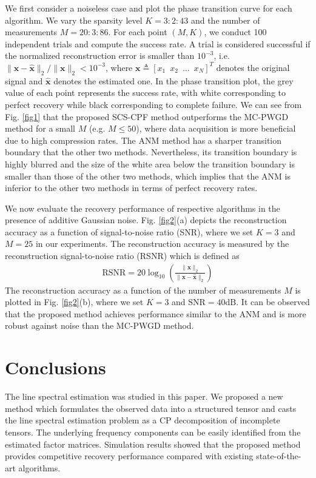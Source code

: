 \documentclass[10pt,journal,epsfig]{IEEEtran}
\begin{document}
We first consider a noiseless case and plot the phase transition
curve for each algorithm. We vary the sparsity level $K=3:2:43$
and the number of measurements $M=20:3:86$. For each point
$(M,K)$, we conduct 100 independent trials and compute the success
rate. A trial is considered successful if the normalized
reconstruction error is smaller than $10^{-3}$, i.e.
$\|\boldsymbol{x}-\boldsymbol{\hat{x}}\|_2/\|\boldsymbol{x}\|_2<10^{-3}$,
where $\boldsymbol{x}\triangleq
[x_1\phantom{0}x_2\phantom{0}\ldots\phantom{0}x_N]^T$ denotes the
original signal and $\boldsymbol{\hat{x}}$ denotes the estimated
one. In the phase transition plot, the grey value of each point
represents the success rate, with white corresponding to perfect
recovery while black corresponding to complete failure. We can see
from Fig. \ref{fig1} that the proposed SCS-CPF method outperforms
the MC-PWGD method for a small $M$ (e.g. $M\leq 50$), where data
acquisition is more beneficial due to high compression rates. The
ANM method has a sharper transition boundary that the other two
methods. Nevertheless, its transition boundary is highly blurred
and the size of the white area below the transition boundary is
smaller than those of the other two methods, which implies that
the ANM is inferior to the other two methods in terms of perfect
recovery rates.



We now evaluate the recovery performance of respective algorithms
in the presence of additive Gaussian noise. Fig. \ref{fig2}(a)
depicts the reconstruction accuracy as a function of
signal-to-noise ratio (SNR), where we set $K=3$ and $M=25$ in our
experiments. The reconstruction accuracy is measured by the
reconstruction signal-to-noise ratio (RSNR) which is defined as
\begin{align}
\text{RSNR}=20\log_{10}\left(\frac{\|\boldsymbol{x}\|_2}{\|\boldsymbol{x}-
\boldsymbol{\hat{x}}\|_2}\right) \nonumber
\end{align}
The reconstruction accuracy as a function of the number of
measurements $M$ is plotted in Fig. \ref{fig2}(b), where we set
$K=3$ and $\text{SNR}=40\text{dB}$. It can be observed that the
proposed method achieves performance similar to the ANM and is
more robust against noise than the MC-PWGD method.










\section{Conclusions}
The line spectral estimation was studied in this paper. We
proposed a new method which formulates the observed data into a
structured tensor and casts the line spectral estimation problem
as a CP decomposition of incomplete tensors. The underlying
frequency components can be easily identified from the estimated
factor matrices. Simulation results showed that the proposed
method provides competitive recovery performance compared with
existing state-of-the-art algorithms.











\end{document}
